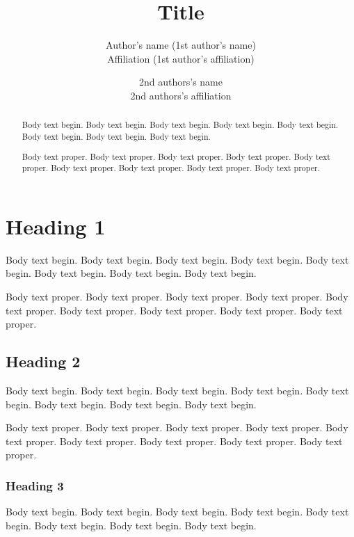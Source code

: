
\title{Title}
\author{Author's name (1st author's name)\\
Affiliation (1st author's affiliation)
\and
2nd authors's name\\
2nd authors's affiliation}

\maketitle

\thispagestyle{empty}

\begin{abstract}
Body text begin. Body text begin. Body text begin. Body text begin. Body text
begin. Body text begin. Body text begin. Body text begin. 

Body text proper.  Body text proper.  Body text proper.  Body text proper.
Body text proper.  Body text proper.  Body text proper.  Body text proper.
Body text proper.  
\end{abstract}

\section{Heading 1}
Body text begin. Body text begin. Body text begin. Body text begin. Body text
begin. Body text begin. Body text begin. Body text begin. 

Body text proper.  Body text proper.  Body text proper.  Body text proper.
Body text proper.  Body text proper.  Body text proper.  Body text proper.
Body text proper.  

\subsection{Heading 2}
Body text begin. Body text begin. Body text begin. Body text begin. Body text
begin. Body text begin. Body text begin. Body text begin. 

Body text proper.  Body text proper.  Body text proper.  Body text proper.
Body text proper.  Body text proper.  Body text proper.  Body text proper.
Body text proper.  

\subsubsection{Heading 3}
Body text begin. Body text begin. Body text begin. Body text begin. Body text
begin. Body text begin. Body text begin. Body text begin. 

